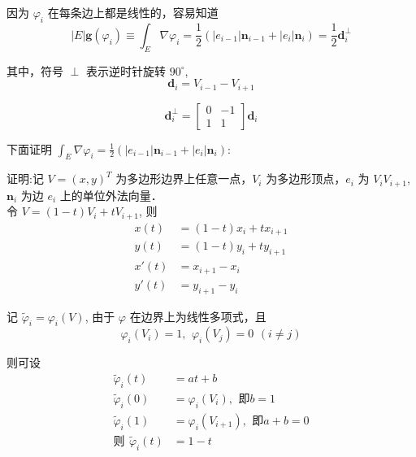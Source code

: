 因为 $\varphi_i$ 在每条边上都是线性的，容易知道 \\
\begin{equation}
|E|\mathbf g(\varphi_i) \equiv \int_E \nabla \varphi_i = \frac{1}{2} (|e_{i-1}| \mathbf{n}_{i-1} + |e_i| \mathbf{n}_i) = \frac{1}{2} \mathbf{d}_i^\perp
\end{equation}

其中，符号 $\perp$ 表示逆时针旋转 $90^\circ$, \\
\begin{equation*}
\mathbf{d}_i = V_{i-1}-V_{i+1}
\end{equation*}

\begin{equation*}
\mathbf{d}_i^{\perp}=\begin{bmatrix}0&-1\\1&1\end{bmatrix}\mathbf{d}_i
\end{equation*}

下面证明 $\int_E \nabla \varphi_i = \frac{1}{2} (|e_{i-1}| \mathbf{n}_{i-1} + |e_i| \mathbf{n}_i)$:

证明:记 $V = (x,y)^T$ 为多边形边界上任意一点，$V_i$ 为多边形顶点，$e_i$ 为 $V_iV_{i+1}$, $\mathbf{n}_i$ 为边 $e_i$ 上的单位外法向量． \\

令 $V = (1 - t)V_i + tV_{i + 1}$, 则 \\
\begin{equation*}
\begin{aligned}
x(t) & = (1 - t)x_i + tx_{i + 1} \\
y(t) & = (1 - t)y_i + ty_{i + 1} \\
x'(t) & = x_{i + 1} - x_i \\
y'(t) & = y_{i + 1} - y_i
\end{aligned}
\end{equation*}

记 $\tilde{\varphi}_i = \varphi_i(V)$, 由于 $\varphi$ 在边界上为线性多项式，且 \\
\begin{equation*}
\varphi_i(V_i) = 1,\,\ \varphi_i(V_j) = 0\,\ (i\ne j)
\end{equation*}

则可设 \\
\begin{equation*}
\begin{aligned}
\tilde{\varphi}_i(t) & = at + b \\
\tilde{\varphi}_i(0) & = \varphi_i(V_i),\,\ \text{即} b = 1 \\
\tilde{\varphi}_i(1) & = \varphi_i(V_{i+1}),\,\ \text{即} a + b = 0 \\
\text{则} \,\ \tilde{\varphi}_i(t) & = 1 - t 
\end{aligned}
\end{equation*}


